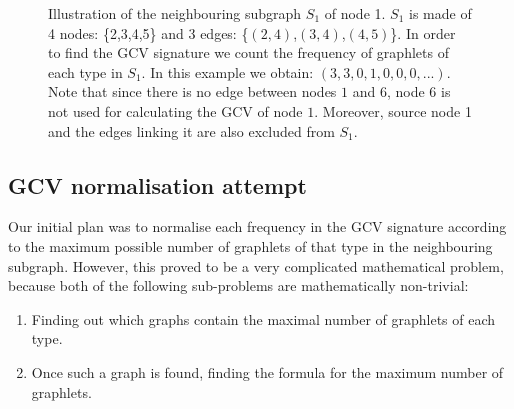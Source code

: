 \begin{figure} 
\centering
{}
\caption[Illustration of the neighbouring of a node]{Illustration of the neighbouring subgraph $S_1$ of node 1. $S_1$ is made of 4 nodes: \{2,3,4,5\} and 3 edges: \{$(2,4)$,$(3,4)$,$(4,5)$\}. In order to find the GCV signature we count the frequency of graphlets of each type in $S_1$. In this example we obtain: $(3,3,0,1,0,0,0,...)$. Note that since there is no edge between nodes $1$ and $6$, node $6$ is not used for calculating the GCV of node $1$. Moreover, source node 1 and the edges linking it are also excluded from $S_1$.}
\end{figure}


\subsection{GCV normalisation attempt}
\label{sec:gcv_norm_attempt}

Our initial plan was to normalise each frequency in the GCV signature according to the maximum possible number of graphlets of that type in the neighbouring subgraph. However, this proved to be a very complicated mathematical problem, because both of the following sub-problems are mathematically non-trivial:
\begin{enumerate}
 \item Finding out which graphs contain the maximal number of graphlets of each type.
 \item Once such a graph is found, finding the formula for the maximum number of graphlets.
\end{enumerate}

